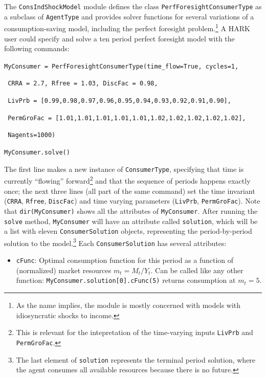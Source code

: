 \documentclass[12pt,titlepage,letterpaper]{econtex}
\begin{document}
{The \texttt{ConsIndShockModel} module defines the class \texttt{PerfForesightConsumerType} as a subclass of \texttt{AgentType} and provides solver functions for several variations of a consumption-saving model, including the perfect foresight problem.\footnote{As the name implies, the module is mostly concerned with models with idiosyncratic shocks to income.}  A HARK user could specify and solve a ten period perfect foresight model with the following commands:

\vspace{0.25cm}

\noindent \texttt{MyConsumer = PerfForesightConsumerType(time\_flow=True, cycles=1,}

\texttt{    CRRA = 2.7, Rfree = 1.03, DiscFac = 0.98,}

\texttt{    LivPrb = [0.99,0.98,0.97,0.96,0.95,0.94,0.93,0.92,0.91,0.90],}

\texttt{    PermGroFac = [1.01,1.01,1.01,1.01,1.01,1.02,1.02,1.02,1.02,1.02],}

\texttt{    Nagents=1000)}

\noindent \texttt{MyConsumer.solve()}

\vspace{0.25cm}

The first line makes a new instance of \texttt{ConsumerType}, specifying that time is currently ``flowing'' forward\footnote{This is relevant for the intepretation of the time-varying inputs \texttt{LivPrb} and \texttt{PermGroFac}.} and that the sequence of periods happens exactly once; the next three lines (all part of the same command) set the time invariant (\texttt{CRRA}, \texttt{Rfree}, \texttt{DiscFac}) and time varying parameters (\texttt{LivPrb}, \texttt{PermGroFac}). Note that \texttt{dir(MyConsumer)} shows all the attributes of \texttt{MyConsumer}. After running the \texttt{solve} method, \texttt{MyConsumer} will have an attribute called \texttt{solution}, which will be a list with eleven \texttt{ConsumerSolution} objects, representing the period-by-period solution to the model.\footnote{The last element of \texttt{solution} represents the terminal period solution, where the agent consumes all available resources because there is no future.}  Each \texttt{ConsumerSolution} has several attributes:
\begin{itemize}
\item \texttt{cFunc}: Optimal consumption function for this period as a function of (normalized) market resources $m_t = M_t/Y_t$. Can be called like any other function: \texttt{MyConsumer.solution[0].cFunc(5)} returns consumption at $m_t = 5$.


\end{itemize}}
\end{document}
